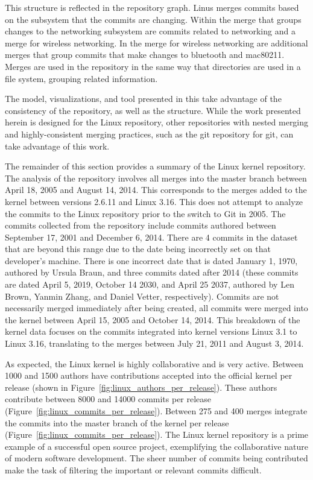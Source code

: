 This structure is reflected in the repository graph.
Linus merges commits based on the subsystem that the commits are changing.
Within the merge that groups changes to the networking subsystem are
commits related to networking and a merge for wireless networking.
In the merge for wireless networking are additional merges that group
commits that make changes to bluetooth and mac80211.
Merges are used in the repository in the same way that directories are
used in a file system, grouping related information.

The model, visualizations, and tool presented in this \paper{} take
advantage of the consistency of the repository, as well as the
structure.
While the work presented herein is designed for the Linux repository,
other repositories with nested merging and highly-consistent merging
practices, such as the git repository for git, can take advantage of
this work.

The remainder of this section provides a summary of the Linux kernel
repository.
The analysis of the repository involves all merges into the master
branch between April 18, 2005 and August 14, 2014.
This corresponds to the merges added to the kernel between versions
2.6.11 and Linux 3.16.
This \paper{} does not attempt to analyze the commits to the Linux
repository prior to the switch to Git in 2005.
The commits collected from the repository include commits authored
between September 17, 2001 and December 6, 2014.
There are 4 commits in the dataset that are beyond this range due to
the date being incorrectly set on that developer's machine.
There is one incorrect date that is dated January 1, 1970, authored by
Ursula Braun, and three commits dated after 2014
(these commits are dated April 5, 2019, October 14 2030, and
April 25 2037, authored by Len Brown, Yanmin Zhang, and Daniel Vetter,
respectively).
Commits are not necessarily merged immediately after being created,
all commits were merged into the kernel between April 15, 2005 and
October 14, 2014.
This breakdown of the kernel data focuses on the commits integrated
into kernel versions Linux 3.1 to Linux 3.16, translating to the merges
between July 21, 2011 and August 3, 2014.

As expected, the Linux kernel is highly collaborative and is very
active. Between 1000 and 1500 authors have contributions accepted into
the official kernel per release (shown in
Figure~\ref{fig:linux_authors_per_release}).
These authors contribute between 8000 and 14000 commits per release
(Figure~\ref{fig:linux_commits_per_release}).
Between 275 and 400 merges integrate the commits into the master branch
of the kernel per release (Figure~\ref{fig:linux_commits_per_release}).
The Linux kernel repository is a prime example of a successful open
source project, exemplifying the collaborative nature of modern software
development.
The sheer number of commits being contributed make the task
of filtering the important or relevant commits difficult.

